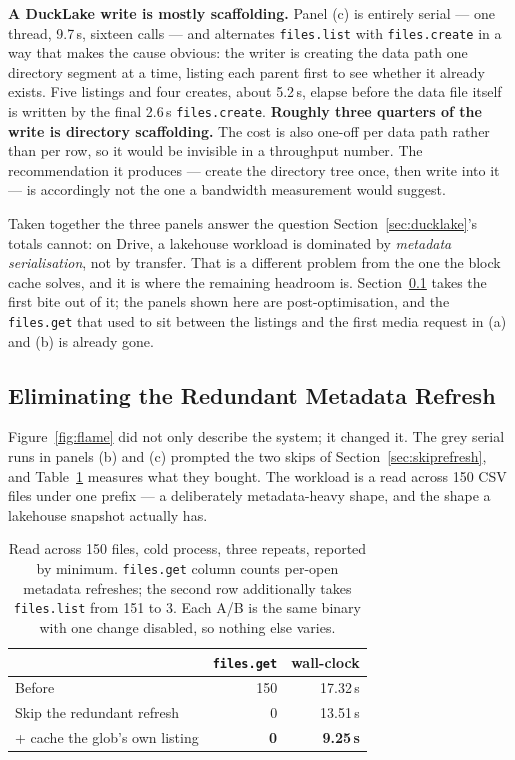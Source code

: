 \documentclass[sigconf, nonacm]{acmart}
\begin{document}
\textbf{A DuckLake write is mostly scaffolding.}
Panel (c) is entirely serial --- one thread, 9.7\,s, sixteen calls --- and
alternates \texttt{files.list} with \texttt{files.create} in a way that makes
the cause obvious: the writer is creating the data path one directory segment
at a time, listing each parent first to see whether it already exists. Five
listings and four creates, about 5.2\,s, elapse before the data file itself is
written by the final 2.6\,s \texttt{files.create}. \textbf{Roughly three
quarters of the write is directory scaffolding.} The cost is also one-off per
data path rather than per row, so it would be invisible in a throughput
number. The recommendation it produces --- create the directory tree once,
then write into it --- is accordingly not the one a bandwidth measurement
would suggest.

Taken together the three panels answer the question
Section~\ref{sec:ducklake}'s totals cannot: on Drive, a lakehouse workload is
dominated by \emph{metadata serialisation}, not by transfer. That is a
different problem from the one the block cache solves, and it is where the
remaining headroom is. Section~\ref{sec:evalrefresh} takes the first bite out
of it; the panels shown here are post-optimisation, and the \texttt{files.get}
that used to sit between the listings and the first media request in (a) and
(b) is already gone.

\subsection{Eliminating the Redundant Metadata Refresh}
\label{sec:evalrefresh}

Figure~\ref{fig:flame} did not only describe the system; it changed it. The
grey serial runs in panels (b) and (c) prompted the two skips of
Section~\ref{sec:skiprefresh}, and Table~\ref{tab:refresh} measures what they
bought. The workload is a read across 150 CSV files under one prefix --- a
deliberately metadata-heavy shape, and the shape a lakehouse snapshot actually
has.

\begin{table}[t]
\caption{Read across 150 files, cold process, three repeats, reported by
minimum. \texttt{files.get} column counts per-open metadata refreshes; the
second row additionally takes \texttt{files.list} from 151 to 3. Each A/B is
the same binary with one change disabled, so nothing else varies.}
\label{tab:refresh}
\small
\begin{tabular}{lrr}
\toprule
& \texttt{files.get} & wall-clock \\
\midrule
Before                                   & 150 & 17.32\,s \\
Skip the redundant refresh               & 0 & 13.51\,s \\
\quad + cache the glob's own listing     & \textbf{0} & \textbf{9.25\,s} \\
\bottomrule
\end{tabular}
\end{table}
\end{document}
